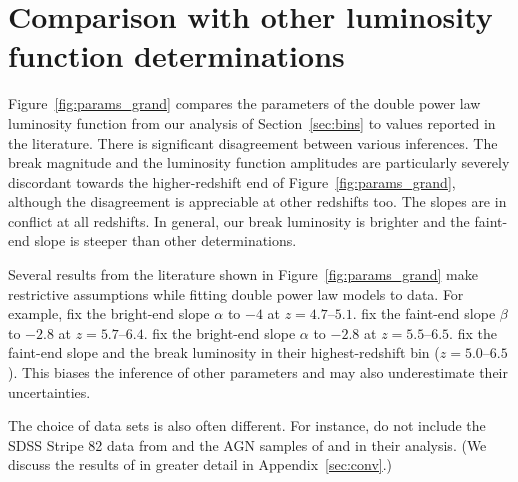 \documentclass[fleqn,usenatbib]{mnras}
\newcommand{\new}[1]{{\color{notecolor} #1}}
\begin{document}
\section{Comparison with other luminosity function determinations}
\label{sec:qlfliterature}
Figure~\ref{fig:params_grand} compares the parameters of the double
power law luminosity function from our analysis of
Section~\ref{sec:bins} to values reported in the literature.
\new{There is significant disagreement between various inferences.
  The break magnitude and the luminosity function amplitudes are
  particularly severely discordant towards the higher-redshift end of
  Figure~\ref{fig:params_grand}, although the disagreement is
  appreciable at other redshifts too.  The slopes are in conflict at
  all redshifts.} In general, our break luminosity is brighter and the
faint-end slope is steeper than other determinations.

Several results from the literature shown in
Figure~\ref{fig:params_grand} make restrictive assumptions while
fitting double power law models to data.  For example,
\citet{2013ApJ...768..105M} fix the bright-end slope $\alpha$ to $-4$
at $z=4.7$--$5.1$.  \citet{2016ApJ...833..222J} fix the faint-end
slope $\beta$ to $-2.8$ at $z=5.7$--$6.4$.
\citet{2017ApJ...847L..15O} fix the bright-end slope $\alpha$ to
$-2.8$ at $z=5.5$--$6.5$.  \citet{2015AA...578A..83G} fix the
faint-end slope and the break luminosity in their highest-redshift bin
($z=5.0$--$6.5$).  \new{This biases the inference of other parameters
  and may also underestimate their uncertainties.}

The choice of data sets is also often different.
For instance, \citet{2015AA...578A..83G} do not include the SDSS
Stripe 82 data from \citet{2013ApJ...768..105M} and the AGN samples of
\citet{2010AJ....139..906W} and \citet{2015ApJ...798...28K} in their
analysis.  (We discuss the results of \citet{2015AA...578A..83G} in
greater detail in Appendix~\ref{sec:conv}.)
\end{document}
